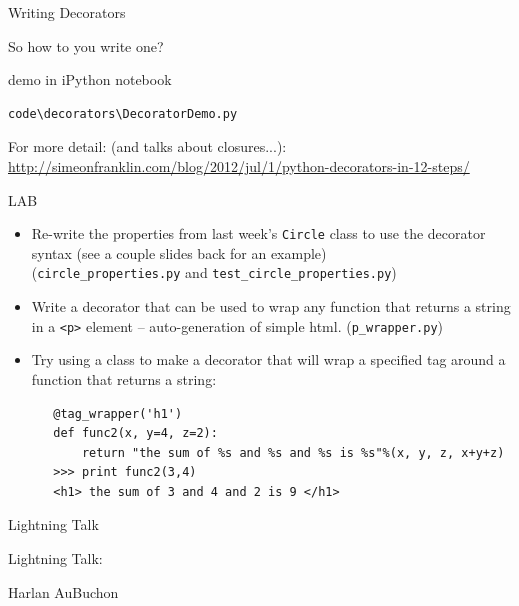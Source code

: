 \documentclass{beamer}
\begin{document}
\begin{frame}[fragile]{Writing Decorators}

{\LARGE So how to you write one?}

\vfill
{\Large
demo in iPython notebook

\vfill
\begin{verbatim}
code\decorators\DecoratorDemo.py
\end{verbatim}
}

\vfill
{\large For more detail: (and talks about closures...):}\\

\url{http://simeonfranklin.com/blog/2012/jul/1/python-decorators-in-12-steps/}

\end{frame} 


\begin{frame}[fragile]{LAB}

\begin{itemize}
  \item Re-write the properties from last week's \verb|Circle| class
        to use the decorator syntax (see a couple slides back for an example)\\
        (\verb|circle_properties.py| and \verb|test_circle_properties.py|)
  \item Write a decorator that can be used to wrap any function that returns a string in a \verb|<p>| element -- auto-generation of simple html.
 (\verb|p_wrapper.py|)      

  \item Try using a class to make a decorator that will wrap a
   specified tag around a function that returns a string:
   \begin{verbatim}
   @tag_wrapper('h1')
   def func2(x, y=4, z=2):
       return "the sum of %s and %s and %s is %s"%(x, y, z, x+y+z)
   >>> print func2(3,4)
   <h1> the sum of 3 and 4 and 2 is 9 </h1>
   \end{verbatim}
\end{itemize}

\end{frame}

\begin{frame}{Lightning Talk}

{\LARGE Lightning Talk:}

\vfill
{\Large  Harlan AuBuchon}

\end{frame}
\end{document}

